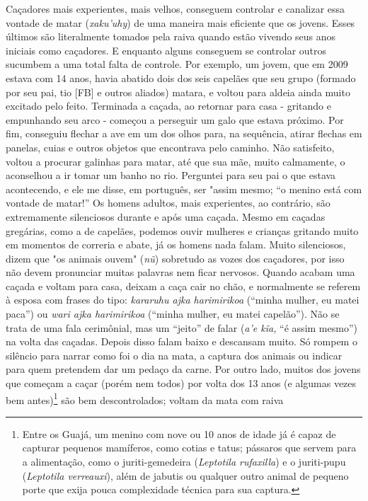 Caçadores mais experientes, mais velhos, conseguem controlar e canalizar
essa vontade de matar (\emph{xaku'uhy}) de uma maneira mais eficiente
que os jovens. Esses últimos são literalmente tomados pela raiva quando
estão vivendo seus anos iniciais como caçadores. E enquanto alguns
conseguem se controlar outros sucumbem a uma total falta de controle.
Por exemplo, um jovem, que em 2009 estava com 14 anos, havia abatido
dois dos seis capelães que seu grupo (formado por seu pai, tio {[}FB{]}
e outros aliados) matara, e voltou para aldeia ainda muito excitado pelo
feito. Terminada a caçada, ao retornar para casa - gritando e empunhando
seu arco - começou a perseguir um galo que estava próximo. Por fim,
conseguiu flechar a ave em um dos olhos para, na sequência, atirar
flechas em panelas, cuias e outros objetos que encontrava pelo caminho.
Não satisfeito, voltou a procurar galinhas para matar, até que sua mãe,
muito calmamente, o aconselhou a ir tomar um banho no rio. Perguntei
para seu pai o que estava acontecendo, e ele me disse, em português, ser
"assim mesmo; ``o menino está com vontade de matar!'' Os homens adultos,
mais experientes, ao contrário, são extremamente silenciosos durante e
após uma caçada. Mesmo em caçadas gregárias, como a de capelães, podemos
ouvir mulheres e crianças gritando muito em momentos de correria e
abate, já os homens nada falam. Muito silenciosos, dizem que "os animais
ouvem" (\emph{nũ}) sobretudo as vozes dos caçadores, por isso não devem
pronunciar muitas palavras nem ficar nervosos. Quando acabam uma caçada
e voltam para casa, deixam a caça cair no chão, e normalmente se referem
à esposa com frases do tipo: \emph{kararuhu ajka harimirikoa} (``minha
mulher, eu matei paca'') ou \emph{wari ajka harimirikoa} (``minha
mulher, eu matei capelão''). Não se trata de uma fala cerimônial, mas um
``jeito'' de falar (\emph{a'e kĩa,} ``é assim mesmo'') na volta das
caçadas. Depois disso falam baixo e descansam muito. Só rompem o
silêncio para narrar como foi o dia na mata, a captura dos animais ou
indicar para quem pretendem dar um pedaço da carne. Por outro lado,
muitos dos jovens que começam a caçar (porém nem todos) por volta dos 13
anos (e algumas vezes bem antes)\footnote{Entre os Guajá, um menino com
  nove ou 10 anos de idade já é capaz de capturar pequenos mamíferos,
  como cotias e tatus; pássaros que servem para a alimentação, como o
  juriti-gemedeira (\emph{Leptotila rufaxilla}) e o juriti-pupu
  (\emph{Leptotila verreauxi}), além de jabutis ou qualquer outro animal
  de pequeno porte que exija pouca complexidade técnica para sua
  captura.} são bem descontrolados; voltam da mata com raiva
